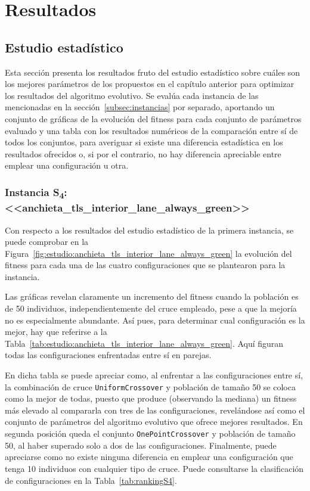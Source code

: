 \chapter{Resultados}
\label{cap:4-resultados}

\section{Estudio estadístico}

Esta sección presenta los resultados fruto del estudio estadístico sobre cuáles son los mejores parámetros de los propuestos en el capítulo anterior para optimizar los resultados del algoritmo evolutivo. Se evalúa cada instancia de las mencionadas en la sección~\ref{subsec:instancias} por separado, aportando un conjunto de gráficas de la evolución del fitness para cada conjunto de parámetros evaluado y una tabla con los resultados numéricos de la comparación entre sí de todos los conjuntos, para averiguar si existe una diferencia estadística en los resultados ofrecidos o, si por el contrario, no hay diferencia apreciable entre emplear una configuración u otra.

\subsection{Instancia S\textsubscript{4}: <<anchieta\_tls\_interior\_lane\_always\_green>>}


Con respecto a los resultados del estudio estadístico de la primera instancia, se puede comprobar en la Figura~\ref{fig:estudio:anchieta_tls_interior_lane_always_green} la evolución del fitness para cada una de las cuatro configuraciones que se plantearon para la instancia. 

Las gráficas revelan claramente un incremento del fitness cuando la población es de 50 individuos, independientemente del cruce empleado, pese a que la mejoría no es especialmente abundante. Así pues, para determinar cual configuración es la mejor, hay que referirse a la Tabla~\ref{tab:estudio:anchieta_tls_interior_lane_always_green}. Aquí figuran todas las configuraciones enfrentadas entre sí en parejas.

En dicha tabla se puede apreciar como, al enfrentar a las configuraciones entre sí, la combinación de cruce \texttt{UniformCrossover} y población de tamaño 50 se coloca como la mejor de todas, puesto que produce (observando la mediana) un fitness más elevado al compararla con tres de las configuraciones, revelándose así como el conjunto de parámetros del algoritmo evolutivo que ofrece mejores resultados. En segunda posición queda el conjunto \texttt{OnePointCrossover} y población de tamaño 50, al haber superado solo a dos de las configuraciones. Finalmente, puede apreciarse como no existe ninguna diferencia en emplear una configuración que tenga 10 individuos con cualquier tipo de cruce. Puede consultarse la clasificación de configuraciones en la Tabla~\ref{tab:rankingS4}.

